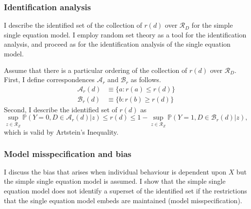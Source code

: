 \documentclass[12pt,a4paper,twoside]{article}
\numberwithin{equation}{section}
\newcommand{\Art}{Artstein's Inequality}
\begin{document}
\subsubsection{Identification analysis}
I describe the identified set of the collection of $r(d)$ over $\mathcal{R}_D$ for the simple single equation model. I employ random set theory as a tool for the identification analysis, and proceed as for the identification analysis of the single equation model. 

Assume that there is a particular ordering of the collection of $r(d)$ over $\mathcal{R}_D$. First, I define correspondences $\mathcal{A}_r$ and $\mathcal{B}_r$ as follows.
\begin{align*}
\mathcal{A}_r(d)&\equiv\lbrace a : r(a)\leq r(d)\rbrace\\
\mathcal{B}_r(d)&\equiv\lbrace b : r(b)\geq r(d)\rbrace
\end{align*}
Second, I describe the identified set of $r(d)$ as
\begin{equation}
\sup_{z\in\mathcal{R}_Z}\mathbb{P}(Y=0,D\in\mathcal{A}_r(d)|z)\leq r(d)\leq 1-\sup_{z\in\mathcal{R}_Z}\mathbb{P}(Y=1,D\in\mathcal{B}_r(d)|z),\label{eq:rident}
\end{equation}
which is valid by {\Art}.
\subsubsection{Model misspecification and bias}
I discuss the bias that arises when individual behaviour is dependent upon $X$ but the simple single equation model is assumed. I show that the simple single equation model does not identify a superset of the identified set if the restrictions that the single equation model embeds are maintained (model misspecification).
\end{document}
